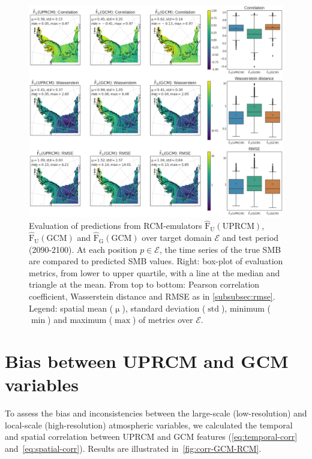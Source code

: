 \documentclass[a4paper,11pt,oneside]{report}
\begin{document}
\begin{figure}[!ht]
  \centering
  \includegraphics[width=\columnwidth]{doc/Thesis-latex/images/results/metrics_RCM_GCM.pdf}
  \caption []{\small Evaluation of predictions from RCM-emulators $\mathrm{\hat{F}_{U}(UPRCM)}$,  $\mathrm{\hat{F}_{U}(GCM)}$ and $\mathrm{\hat{F}_{G}(GCM)}$ over target domain $\mathcal{E}$ and test period (2090-2100). At each position $p \in\mathcal{E}$, the time series of the true SMB are compared to predicted SMB values. Right: box-plot of evaluation metrics, from lower to upper quartile, with a line at the median and triangle at the mean. From top to bottom: Pearson correlation coefficient, Wasserstein distance and RMSE as in \autoref{subsubsec:rmse}. Legend: spatial mean ($\operatorname{\mu}$), standard deviation ($\operatorname{std}$), minimum ($\min$) and maximum ($\max$) of metrics over $\mathcal{E}$.}
  \vspace{-3mm}
  \label{fig:evaluation-GCM-RCM}
\end{figure}

\section{Bias between UPRCM and GCM variables}\label{sec:res-bias-RCM-GCM}
To assess the bias and inconsistencies between the large-scale (low-resolution) and local-scale (high-resolution) atmospheric variables, we calculated the temporal and spatial correlation between UPRCM and GCM features (\autoref{eq:temporal-corr} and~\ref{eq:spatial-corr}). Results are illustrated in~\autoref{fig:corr-GCM-RCM}. 
\end{document}
